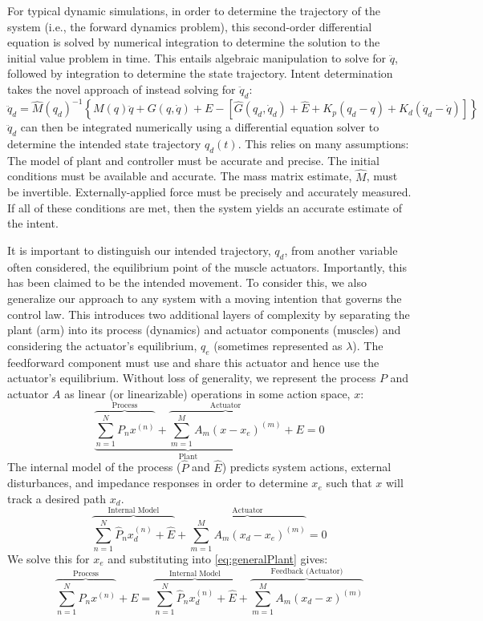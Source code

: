 For typical dynamic simulations, in order to determine the trajectory of the system (i.e., the forward dynamics problem), this second-order differential equation is solved by numerical integration to determine the solution to the initial value problem in time. This entails algebraic manipulation to solve for $\ddot{q}$, followed by integration to determine the state trajectory. Intent determination takes the novel approach of instead solving for $\ddot{q}_d$:
\begin{equation}
\ddot{q}_d=\hat{M}(q_d)^{-1}\left\{M(q)\ddot{q}+G(q,\dot{q})+E-[\hat{G}(q_d,\dot{q}_d)+\hat{E}+K_p(q_d-q)+K_d(\dot{q}_d-\dot{q})]\right\}
\end{equation}  
$\ddot{q}_d$ can then be integrated numerically using a differential equation solver to determine the intended state trajectory $q_d(t)$. This relies on many assumptions: The model of plant and controller must be accurate and precise. The initial conditions must be available and accurate. The mass matrix estimate, $\hat{M}$, must be invertible. Externally-applied force must be precisely and accurately measured. If all of these conditions are met, then the system yields an accurate estimate of the intent.

It is important to distinguish our intended trajectory, $q_d$, from another variable often considered, the equilibrium point of the muscle actuators. Importantly, this has been claimed to be the intended movement\cite{feldman1995origin}. To consider this, we also generalize our approach to any system with a moving intention that governs the control law. This introduces two additional layers of complexity by separating the plant (arm) into its process (dynamics) and actuator components (muscles) and considering the actuator's equilibrium, $q_e$ (sometimes represented as $\lambda$). The feedforward component must use and share this actuator and hence use the actuator's equilibrium. Without loss of generality, we represent the process $P$ and actuator $A$ as linear (or linearizable) operations in some action space, $x$:
\begin{equation} \label{eq:generalPlant}
\underbrace{\overbrace{\sum_{n=1}^N P_nx^{(n)}}^\text{Process}+\overbrace{\sum_{m=1}^M A_m(x-x_e)^{(m)}}^\text{Actuator}}_\text{Plant}+E=0
\end{equation}
The internal model of the process ($\hat{P}$ and $\hat{E}$) predicts system actions, external disturbances, and impedance responses in order to determine $x_e$ such that $x$ will track a desired path $x_d$.    
\begin{equation}
\overbrace{\sum_{n=1}^N \hat{P}_n x^{(n)}_d+\hat{E}}^\text{Internal Model}+\overbrace{\sum_{m=1}^M A_m(x_d-x_e)^{(m)}}^\text{Actuator}=0
\end{equation}
We solve this for $x_e$ and substituting into \eqref{eq:generalPlant} gives:
\begin{equation}
\overbrace{\sum_{n=1}^N P_nx^{(n)}}^\text{Process}+E=\overbrace{\sum_{n=1}^N \hat{P}_n x^{(n)}_d+\hat{E}}^\text{Internal Model}+\overbrace{\sum_{m=1}^M A_m (x_d-x)^{(m)}}^\text{Feedback (Actuator)}
\end{equation}

